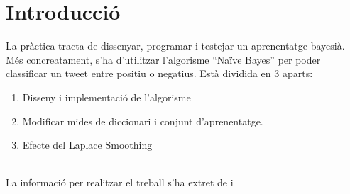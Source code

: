 \chapter{Introducció}

La pràctica tracta de dissenyar, programar i testejar un aprenentatge bayesià. Més concreatament, s’ha d’utilitzar l’algorisme “Naïve Bayes” per poder classificar un tweet entre positiu o negatius. Està dividida en 3 aparts:

\begin{enumerate}
\item Disseny i implementació de l'algorisme
\item Modificar mides de diccionari i conjunt d’aprenentatge.
\item Efecte del Laplace Smoothing
\end{enumerate}

\noindent \\La informació per realitzar el treball s'ha extret de \cite{ML} i \cite{AI}
